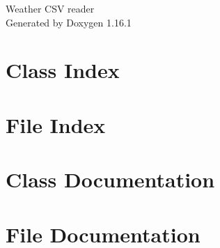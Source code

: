 \documentclass[twoside]{book}
\newcommand{\+}{\discretionary{\mbox{\scriptsize$\hookleftarrow$}}{}{}}
\newcommand{\clearemptydoublepage}{%
    \newpage{\pagestyle{empty}\cleardoublepage}%
  }
\begin{document}
  \raggedbottom
    \hypersetup{pageanchor=false,
                bookmarksnumbered=true,
                pdfencoding=unicode
               }
  \begin{titlepage}
  \vspace*{7cm}
  \begin{center}%
  {\Large Weather CSV reader}\\
  \vspace*{1cm}
  {\large Generated by Doxygen 1.16.1}\\
  \end{center}
  \end{titlepage}
  \clearemptydoublepage
  \tableofcontents
  \clearemptydoublepage
  \hypersetup{pageanchor=true}
\chapter{Class Index}

\chapter{File Index}

\chapter{Class Documentation}







\chapter{File Documentation}




















  \backmatter
  \newpage
  \clearemptydoublepage
  \printindex
\end{document}
